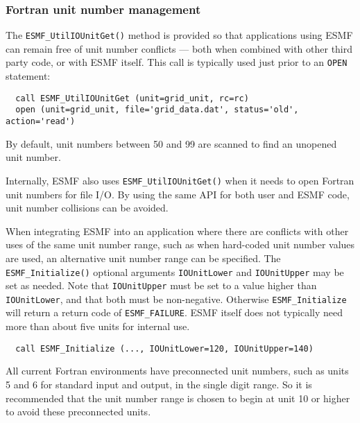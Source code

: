 

\subsubsection{Fortran unit number management} \label{fio:unitnumbers}
The {\tt ESMF\_UtilIOUnitGet()} method is provided so that applications
using ESMF can remain free of unit number conflicts --- both when combined
with other third party code, or with ESMF itself.  This call is typically
used just prior to an {\tt OPEN} statement:

\begin{verbatim}
  call ESMF_UtilIOUnitGet (unit=grid_unit, rc=rc)
  open (unit=grid_unit, file='grid_data.dat', status='old', action='read')
\end{verbatim}

By default, unit numbers between 50 and 99 are scanned to find an unopened
unit number.

Internally, ESMF also uses {\tt ESMF\_UtilIOUnitGet()} when it needs to open
Fortran unit numbers for file I/O.  By using the same API for both user and
ESMF code, unit number collisions can be avoided.

When integrating ESMF into an application where there are conflicts with
other uses of the same unit number range, such as when hard-coded unit number
values are used, an alternative unit number range can be specified.
The {\tt ESMF\_Initialize()} optional arguments {\tt IOUnitLower} and {\tt IOUnitUpper}
may be set as needed.  Note that {\tt IOUnitUpper} must be set to a value higher than
{\tt IOUnitLower}, and that both must be non-negative.  Otherwise {\tt ESMF\_Initialize}
will return a return code of {\tt ESMF\_FAILURE}.  ESMF itself does not typically need more
than about five units for internal use.

\begin{verbatim}
  call ESMF_Initialize (..., IOUnitLower=120, IOUnitUpper=140)
\end{verbatim}

All current Fortran environments have preconnected unit numbers, such as
units 5 and 6 for standard input and output, in the single digit range.
So it is recommended that the unit number range is chosen to begin at unit 10
or higher to avoid these preconnected units.

